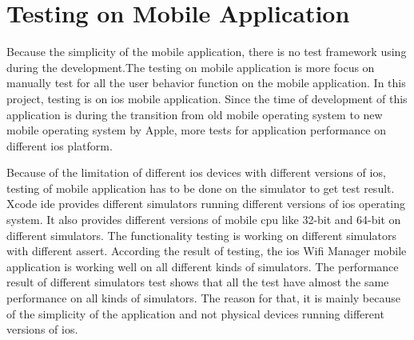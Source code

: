 \section{Testing on Mobile Application}
\par Because the simplicity of the mobile application, there is no test framework using during the development.The testing on mobile application is more focus on manually test for all the user behavior function on the mobile application. In this project, testing is on \gls{ios} mobile application. Since the time of development of this application is during the transition from old mobile operating system to new mobile operating system by Apple, more tests for application performance on different \gls{ios} platform.
\par Because of the limitation of different \gls{ios} devices with different versions of \gls{ios}, testing of mobile application has to be done on the simulator to get test result. Xcode \gls{ide} provides different simulators running different versions of \gls{ios} operating system. It also provides different versions of mobile \gls{cpu} like 32-bit and 64-bit on different simulators. The functionality testing is working on different simulators with different assert. According the result of testing, the \gls{ios} Wifi Manager mobile application is working well on all different kinds of simulators. The performance result of different simulators test shows that all the test have almost the same performance on all kinds of simulators. The reason for that, it is mainly because of the simplicity of the application and not physical devices running different versions of \gls{ios}.